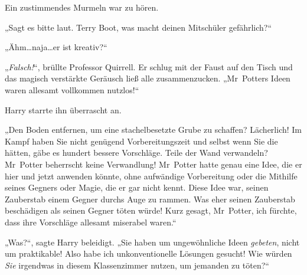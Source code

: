 Ein zustimmendes Murmeln war zu hören.

„Sagt es bitte laut. Terry Boot, was macht deinen Mitschüler gefährlich?“

„Ähm…naja…er ist kreativ?“

„\emph{Falsch!}“, brüllte Professor Quirrell. Er schlug mit der Faust auf den Tisch und das magisch verstärkte Geräusch ließ alle zusammenzucken. „Mr~Potters Ideen waren allesamt vollkommen nutzlos!“

Harry starrte ihn überrascht an.

„Den Boden entfernen, um eine stachelbesetzte Grube zu schaffen? Lächerlich! Im Kampf haben Sie nicht genügend Vorbereitungszeit und selbst wenn Sie die hätten, gäbe es hundert bessere Vorschläge. Teile der Wand verwandeln? Mr~Potter beherrscht keine Verwandlung! Mr~Potter hatte genau eine Idee, die er hier und jetzt anwenden könnte, ohne aufwändige Vorbereitung oder die Mithilfe seines Gegners oder Magie, die er gar nicht kennt. Diese Idee war, seinen Zauberstab einem Gegner durchs Auge zu rammen. Was eher seinen Zauberstab beschädigen als seinen Gegner töten würde! Kurz gesagt, Mr~Potter, ich fürchte, dass ihre Vorschläge allesamt miserabel waren.“

„Was?“, sagte Harry beleidigt. „Sie haben um ungewöhnliche Ideen \emph{gebeten}, nicht um praktikable! Also habe ich unkonventionelle Lösungen gesucht! Wie würden \emph{Sie} irgendwas in diesem Klassenzimmer nutzen, um jemanden zu töten?“

